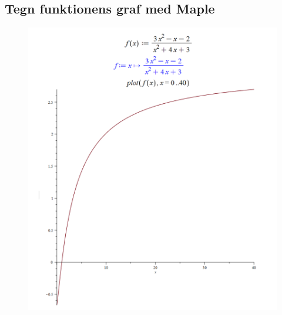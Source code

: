 \documentclass{report}
\begin{document}
\subsection{Tegn funktionens graf med Maple}
\begin{figure}[H]
    \centering
    \includegraphics[width=\textwidth]{javaw_5TJhKriajU.png}
\end{figure}
\end{document}

